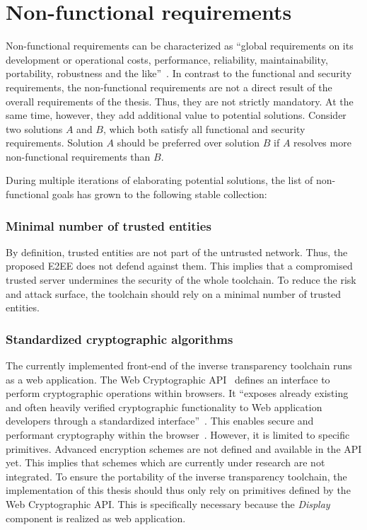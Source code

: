 \documentclass[../main.tex]{subfiles}
\begin{document}
\section{Non-functional requirements}\label{non-functional-requriements}
Non-functional requirements can be characterized as \enquote{global requirements on its development or operational costs, performance, reliability, maintainability, portability, robustness and the like}~\cite[11]{Mylopoulos1992}.
In contrast to the functional and security requirements, the non-functional requirements are not a direct result of the overall requirements of the thesis.
Thus, they are not strictly mandatory.
At the same time, however, they add additional value to potential solutions.
Consider two solutions $A$ and $B$, which both satisfy all functional and security requirements.
Solution $A$ should be preferred over solution $B$ if $A$ resolves more non-functional requirements than $B$.

During multiple iterations of elaborating potential solutions, the list of non-functional goals has grown to the following stable collection:

\subsubsection{Minimal number of trusted entities}
By definition, trusted entities are not part of the untrusted network. 
Thus, the proposed E2EE does not defend against them.
This implies that a compromised trusted server undermines the security of the whole toolchain.
To reduce the risk and attack surface, the toolchain should rely on a minimal number of trusted entities.

\subsubsection{Standardized cryptographic algorithms}
The currently implemented front-end of the inverse transparency toolchain runs as a web application. 
The Web Cryptographic API~\cite{WebCryptoApi2017} defines an interface to perform cryptographic operations within browsers. 
It \enquote{exposes already existing and often heavily verified cryptographic functionality to Web application developers through a standardized interface}~\cite[959]{Halpin2014}.
This enables secure and performant cryptography within the browser~\cite{Halpin2014}.
However, it is limited to specific primitives. 
Advanced encryption schemes are not defined and available in the API yet.
This implies that schemes which are currently under research are not integrated.
To ensure the portability of the inverse transparency toolchain, the implementation of this thesis should thus only rely on primitives defined by the Web Cryptographic API.
This is specifically necessary because the \emph{Display} component is realized as web application.
\end{document}
